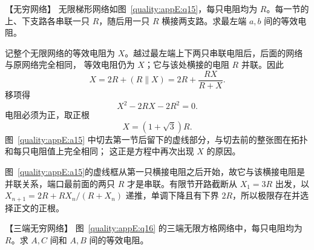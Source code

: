 \begin{origexamplebox}{【无穷网络】}\label{appE:ex:s23-34-7}
无限梯形网络如图~\ref{quality:appE:q15}，每只电阻均为 $R$。每一节的上、下支路各串联一只 $R$，随后用一只
$R$ 横接两支路。求最左端 $a,b$ 间的等效电阻。

\end{origexamplebox}

\begin{xesolution}
记整个无限网络的等效电阻为 $X$。越过最左端上下两只串联电阻后，后面的网络与原网络完全相同，
等效电阻仍为 $X$；它与该处横接的电阻 $R$ 并联。因此
\begin{equation}
  X=2R+(R\parallel X)=2R+\frac{RX}{R+X}.
\end{equation}
移项得
\[
  X^2-2RX-2R^2=0.
\]
电阻必须为正，取正根
\begin{equation}
  \boxed{X=(1+\sqrt3)R}.
\end{equation}
图~\ref{quality:appE:a15} 中切去第一节后留下的虚线部分，与切去前的整张图在拓扑和每只电阻值上完全相同；
这正是方程中再次出现 $X$ 的原因。


图~\ref{quality:appE:a15}的虚线框从第一只横接电阻之后开始，故它与该横接电阻是并联关系，端口最前面的两只 $R$ 才是串联。有限节开路截断从 $X_1=3R$ 出发，以 $X_{n+1}=2R+RX_n/(R+X_n)$ 递推，单调下降且有下界 $2R$，所以极限存在并选择正文的正根。
\end{xesolution}

\begin{origexamplebox}{【三端无穷网络】}\label{appE:ex:s23-34-8}
图~\ref{quality:appE:q16} 的三端无限方格网络中，每只电阻均为 $R$。求 $A,C$ 间和 $A,B$ 间的等效电阻。

\end{origexamplebox}

